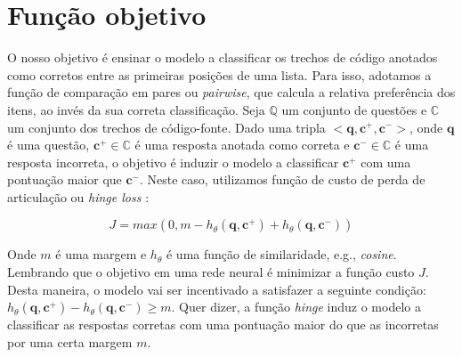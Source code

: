 \section{Função objetivo}
\label{sec:funcao-objetivo}

O nosso objetivo é ensinar o modelo a classificar os trechos de código anotados como corretos entre as primeiras posições de uma lista. Para isso, adotamos a função de comparação em pares ou \textit{pairwise}, que calcula a relativa preferência dos itens, ao invés da sua correta classificação. Seja $\mathbb{Q}$ um conjunto de questões e $\mathbb{C}$ um conjunto dos trechos de código-fonte. Dado uma tripla $<\bm{q}, \bm{c^{+}}, \bm{c^{-}}>$, onde $\bm{q}$ 
é uma questão, $\bm{c^{+}} \in \mathbb{C}$ é uma resposta anotada como correta e $\bm{c^{-}} \in \mathbb{C}$ é uma resposta incorreta, o objetivo é induzir o modelo a classificar $\bm{c^{+}}$ com uma pontuação maior que $\bm{c^{-}}$. Neste caso, utilizamos função de custo de perda de articulação ou \textit{hinge loss} \citep{feng-2015}:

\begin{equation}
J = max(0, m - h_{\theta}(\bm{q}, \bm{c^{+}}) + h_{\theta}(\bm{q}, \bm{c^{-}}))
\end{equation}

Onde $m$ é uma margem e $h_{\theta}$ é uma função de similaridade, e.g., \textit{cosine}. Lembrando que o objetivo em uma rede neural é minimizar a função custo $J$. Desta maneira, o modelo vai ser incentivado a satisfazer a seguinte condição: $h_{\theta}(\bm{q}, \bm{c^{+}}) - h_{\theta}(\bm{q}, \bm{c^{-}}) \geq m$. Quer dizer, a função \textit{hinge} induz o modelo a classificar as respostas corretas com uma pontuação maior do que as incorretas por uma certa margem $m$. 



